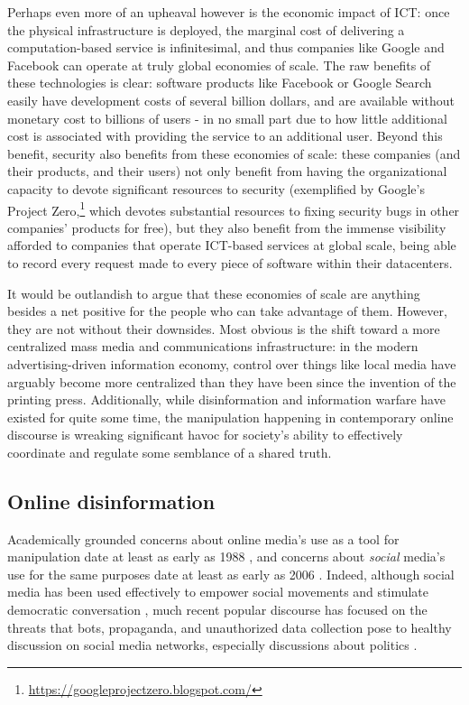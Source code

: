 \documentclass[sigconf,authordraft]{acmart}
\begin{document}
Perhaps even more of an upheaval however is the economic impact of ICT: once the physical infrastructure is deployed, the marginal cost of delivering a computation-based service is infinitesimal, and thus companies like Google and Facebook can operate at truly global economies of scale. The raw benefits of these technologies is clear: software products like Facebook or Google Search easily have development costs of several billion dollars, and are available without monetary cost to billions of users - in no small part due to how little additional cost is associated with providing the service to an additional user. Beyond this benefit, security also benefits from these economies of scale: these companies (and their products, and their users) not only benefit from having the organizational capacity to devote significant resources to security (exemplified by Google's Project Zero,\footnote{\url{https://googleprojectzero.blogspot.com/}} which devotes substantial resources to fixing security bugs in other companies' products for free), but they also benefit from the immense visibility afforded to companies that operate ICT-based services at global scale, being able to record every request made to every piece of software within their datacenters.

It would be outlandish to argue that these economies of scale are anything besides a net positive for the people who can take advantage of them. However, they are not without their downsides. Most obvious is the shift toward a more centralized mass media and communications infrastructure: in the modern advertising-driven information economy, control over things like local media have arguably become more centralized than they have been since the invention of the printing press. Additionally, while disinformation and information warfare have existed for quite some time, the manipulation happening in contemporary online discourse is wreaking significant havoc for society's ability to effectively coordinate and regulate some semblance of a shared truth.

\subsection{Online disinformation}

Academically grounded concerns about online media's use as a tool for manipulation date at least as
early as 1988 \cite{herman2010manufacturing}, and concerns about {\itshape social} media's use for
the same purposes date at least as early as 2006 \cite{howard2006new}. Indeed, although social media
has been used effectively to empower social movements and stimulate democratic conversation
\cite{conover2013digital, gonzalez2011dynamics, varol2014evolution}, much recent popular discourse
has focused on the threats that bots, propaganda, and unauthorized data collection pose to healthy
discussion on social media networks, especially discussions about politics
\cite{BBC_news_chatbot,BBC_news_fakenews,NYT_opinion_chatbot,CambridgeAnalyticaNYT}.
\end{document}
